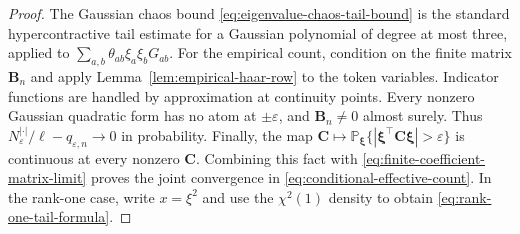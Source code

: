 \documentclass{article}
\newcommand{\Prob}{\mathbb{P}}
\newcommand{\bB}{\mathbf{B}}
\newcommand{\bC}{\mathbf{C}}
\theoremstyle{definition}
\theoremstyle{remark}
\begin{document}
\begin{proof}
The Gaussian chaos bound \eqref{eq:eigenvalue-chaos-tail-bound} is the standard
hypercontractive tail estimate for a Gaussian polynomial of degree at most
three, applied to $\sum_{a,b}\theta_{ab}\xi_a\xi_bG_{ab}$.  For the empirical
count, condition on the finite matrix $\bB_n$ and apply
Lemma~\ref{lem:empirical-haar-row} to the token variables.  Indicator functions
are handled by approximation at continuity points.  Every nonzero Gaussian
quadratic form has no atom at $\pm\varepsilon$, and $\bB_n\neq0$ almost surely.
Thus $N_\varepsilon^{|\cdot|}/\ell-q_{\varepsilon,n}\to0$ in probability.
Finally, the map
$\bC\mapsto\Prob_{\boldsymbol{\xi}}\{|\boldsymbol{\xi}^\top\bC
\boldsymbol{\xi}|>\varepsilon\}$ is continuous at every nonzero $\bC$.
Combining this fact with \eqref{eq:finite-coefficient-matrix-limit} proves the
joint convergence in \eqref{eq:conditional-effective-count}.
In the rank-one case, write $x=\xi^2$ and use the $\chi^2(1)$ density to obtain
\eqref{eq:rank-one-tail-formula}.
\end{proof}
\end{document}
